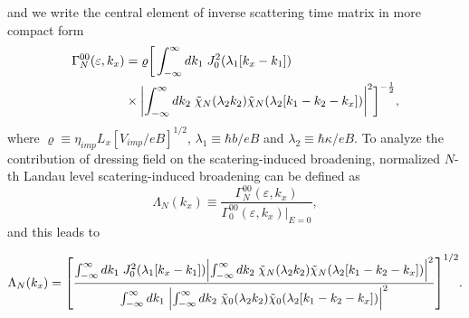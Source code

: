 and we write the central element of inverse scattering time matrix in more compact form
\begin{equation} \label{eq_18}
  \begin{aligned}
    \Gamma^{00}_{N}(\varepsilon,k_x)  &=
    \varrho
    \bigg[
    \int_{-\infty}^{\infty} d {k}_1 \;
    J_0^2\qty(\lambda_1[{k}_x - {k}_1]) \\
    & \times
    \qty|
    \int_{-\infty}^{\infty} d{k}_2 \;
    \tilde{\chi}_{N}\qty(\lambda_2 k_2)
    \tilde{\chi}_{N}\qty(\lambda_2 \qty[{k}_1 - {k}_2 - {k}_x])|^2
    \bigg]^{-\frac{1}{2}},
  \end{aligned}
\end{equation}
where $\varrho \equiv \eta_{imp} L_x [ { V_{imp}}/{eB}]^{1/2}$, $ \lambda_1 \equiv \hbar b/eB$ and  $\lambda_2 \equiv \hbar \kappa/eB$.
To analyze the contribution of dressing field on the scatering-induced broadening, normalized $N$-th Landau level scatering-induced broadening can be defined as
\begin{equation} \label{eq_19}
    \Lambda_N(k_x) \equiv
    \frac{\Gamma^{00}_{N}(\varepsilon,k_x)}{\Gamma^{00}_{0}(\varepsilon,k_x)\big|_{E=0}},
\end{equation}
and this leads to
\begin{widetext}
\begin{equation} \label{eq_20}
    \Lambda_N (k_x) =
    \qty[
    \frac
    {\int_{-\infty}^{\infty} d {k}_1 \;
    J_0^2\qty(\lambda_1[{k}_x - {k}_1])
    \qty|
    \int_{-\infty}^{\infty} d{k}_2 \;
    \tilde{\chi}_{N}\qty(\lambda_2 k_2)
    \tilde{\chi}_{N}\qty(\lambda_2 \qty[{k}_1 - {k}_2 - {k}_x])|^2}
    {\int_{-\infty}^{\infty} d {k}_1 \;
    \qty|
    \int_{-\infty}^{\infty} d{k}_2 \;
    \tilde{\chi}_{0}\qty(\lambda_2 k_2)
    \tilde{\chi}_{0}\qty(\lambda_2 \qty[{k}_1 - {k}_2 - {k}_x])|^2}
    ]^{1/2}.
\end{equation}
\end{widetext}

